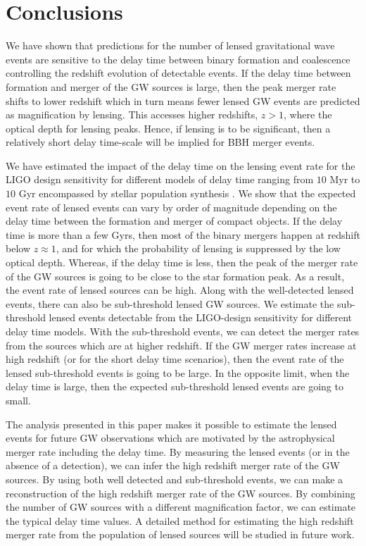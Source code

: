 \documentclass[a4paper,useAMS,usenatbib]{mnras}
\begin{document}
\section{Conclusions}

We have shown that predictions for the number of lensed gravitational wave events are sensitive to the delay time between binary formation and coalescence controlling the redshift evolution of detectable events.  If the delay time between formation and merger of the GW sources is large, then the peak merger rate shifts to lower redshift which in turn means fewer lensed GW events are predicted as magnification by lensing. This accesses higher redshifts, $z>1$, where the optical depth for lensing peaks. Hence, if lensing is to be significant, then a relatively short delay time-scale will be implied for BBH merger events.  

  We have estimated the impact of the delay time on the lensing event rate for the LIGO design sensitivity for different models of delay time ranging from $10$ Myr to $10$ Gyr encompassed by stellar population synthesis \citep{2010ApJ...716..615O,2010MNRAS.402..371B, 2012ApJ...759...52D, Dominik:2014yma, Lamberts:2016txh, Elbert:2017sbr, Eldridge:2018nop,  Buisson:2020hoq, Santoliquido:2020axb}.  We show that the expected event rate of lensed events can vary by order of magnitude depending on the delay time between the formation and merger of compact objects. If the delay time is more than a few Gyrs, then most of the binary mergers happen at redshift below $z\approx1$, and for which the probability of lensing is suppressed by the low optical depth. Whereas, if the delay time is less, then the peak of the merger rate of the GW sources is going to be close to the star formation peak. As a result, the event rate of lensed sources can be high. Along with the well-detected lensed events, there can also be sub-threshold lensed GW sources. We estimate the sub-threshold lensed events detectable from the LIGO-design sensitivity for different delay time models. With the sub-threshold events, we can detect the merger rates from the sources which are at higher redshift. If the GW merger rates increase at high redshift (or for the short delay time scenarios), then the event rate of the lensed sub-threshold events is going to be large. In the opposite limit, when the delay time is large, then the expected sub-threshold lensed events are going to small. 



The analysis presented in this paper makes it possible to estimate the lensed events for future GW observations which are motivated by the astrophysical merger rate including the delay time. By measuring the lensed events (or in the absence of a detection), we can infer the high redshift merger rate of the GW sources. By using both well detected and sub-threshold events, we can make a reconstruction of the high redshift merger rate of the GW sources. By combining the number of GW sources with a different magnification factor, we can estimate the typical delay time values. A detailed method for estimating the high redshift merger rate from the population of lensed sources will be studied in future work. 
\end{document}
